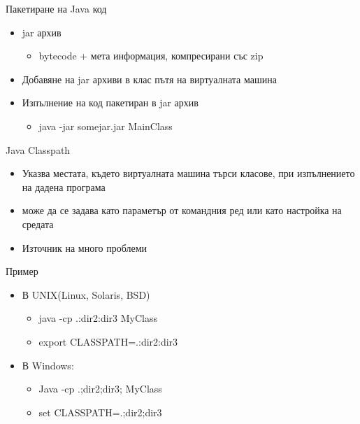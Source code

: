 \documentclass{beamer}
\begin{document}
\begin{frame}{Пакетиране на Java код}
  \transdissolve
  \begin{itemize}
  \item jar архив
    \begin{itemize}
    \item bytecode + мета информация, компресирани със zip
    \end{itemize}
  \item Добавяне на jar архиви в клас пътя на виртуалната машина
  \item Изпълнение на код пакетиран в jar архив
    \begin{itemize}
    \item java -jar somejar.jar MainClass
    \end{itemize}
  \end{itemize}
\end{frame}

\begin{frame}{Java Classpath}
  \transdissolve
  \begin{itemize}
  \item Указва местата, където виртуалната машина търси класове, при
    изпълнението на дадена програма
  \item може да се задава като параметър от командния ред или като
    настройка на средата
  \item Източник на много проблеми
  \end{itemize}
\end{frame}

\begin{frame}{Пример}
  \transdissolve
  \begin{itemize}
  \item В UNIX(Linux, Solaris, BSD)
      \begin{itemize}
      \item java -cp .:dir2:dir3 MyClass
      \item export CLASSPATH=.:dir2:dir3
      \end{itemize}
    \item В Windows:
      \begin{itemize}
      \item Java -cp .;dir2;dir3; MyClass
      \item set CLASSPATH=.;dir2;dir3
      \end{itemize}
  \end{itemize}
\end{frame}
\end{document}
